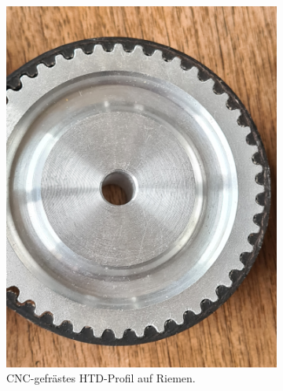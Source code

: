 		\begin{figure}[h]
			\centering
			\begin{subfigure}{.49\textwidth}
				\centering
				\includegraphics[width=\textwidth]{Assets/Machined-HTD_tooth_fit.jpg}
				\caption{CNC-gefrästes HTD-Profil auf Riemen.}
				\label{subfig:machined HTD}
			\end{subfigure}
			\hfill
			\begin{subfigure}{.49\textwidth}
				\centering

\end{subfigure}
\end{figure}
